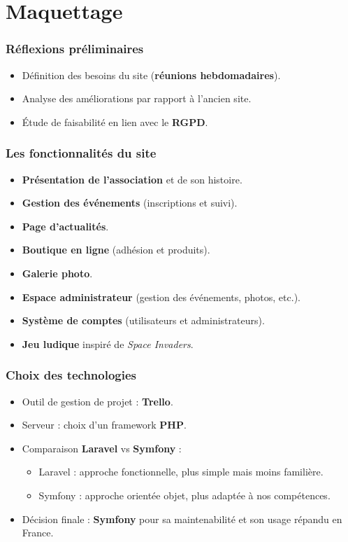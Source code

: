 \section{Maquettage}

\begin{frame}
    \frametitle{Réflexions préliminaires}

    \begin{itemize}
        \item Définition des besoins du site (\textbf{réunions hebdomadaires}).
        \item Analyse des améliorations par rapport à l’ancien site.
        \item Étude de faisabilité en lien avec le \textbf{RGPD}.
    \end{itemize}
\end{frame}

\begin{frame}
    \frametitle{Les fonctionnalités du site}

    \begin{itemize}
        \item \textbf{Présentation de l’association} et de son histoire.
        \item \textbf{Gestion des événements} (inscriptions et suivi).
        \item \textbf{Page d’actualités}.
        \item \textbf{Boutique en ligne} (adhésion et produits).
        \item \textbf{Galerie photo}.
        \item \textbf{Espace administrateur} (gestion des événements, photos, etc.).
        \item \textbf{Système de comptes} (utilisateurs et administrateurs).
        \item \textbf{Jeu ludique} inspiré de \textit{Space Invaders}.
    \end{itemize}
\end{frame}

\begin{frame}
    \frametitle{Choix des technologies}

    \begin{itemize}
        \item Outil de gestion de projet : \textbf{Trello}.
        \item Serveur : choix d’un framework \textbf{PHP}.
        \item Comparaison \textbf{Laravel} vs \textbf{Symfony} :
              \begin{itemize}
                \item Laravel : approche fonctionnelle, plus simple mais moins familière.
                \item Symfony : approche orientée objet, plus adaptée à nos compétences.
              \end{itemize}
        \item Décision finale : \textbf{Symfony} pour sa maintenabilité et son usage répandu en France.
    \end{itemize}
\end{frame}

